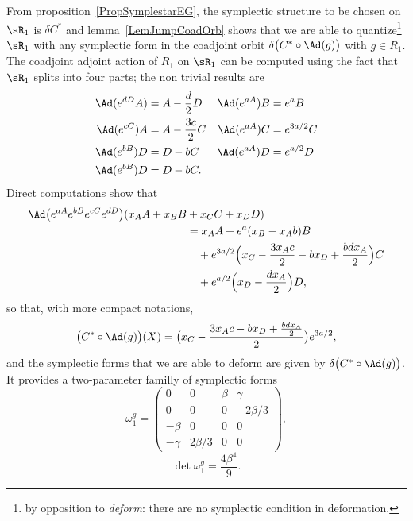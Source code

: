 From proposition~\ref{PropSymplestarEG}, the symplectic structure to be chosen on $\sR_1$ is $\delta C^*$ and lemma~\ref{LemJumpCoadOrb} shows that we are able to quantize\footnote{by opposition to \emph{deform}: there are no symplectic condition in deformation.} $\sR_1$ with any symplectic form in the coadjoint orbit $\delta\big( C^*\circ\Ad(g) \big)$ with $g\in R_1$. The coadjoint adjoint action of $R_1$ on $\sR_1$ can be computed using the fact that $\sR_1$ splits into four parts; the non trivial results are
\begin{align*}
	\Ad( e^{dD}A) & =A-\frac{ d }{2}D  & \Ad( e^{aA})B & = e^{a}B    \\
	\Ad( e^{cC})A & =A-\frac{ 3c }{2}C & \Ad( e^{aA})C & = e^{3a/2}C \\
	\Ad( e^{bB})D & =D-bC              & \Ad( e^{aA})D & = e^{a/2}D  \\
	\Ad( e^{bB})D & =D-bC.
\end{align*}
Direct computations show that
\begin{equation}
	\begin{split}
		\Ad\big(  e^{aA} e^{bB} e^{cC} e^{dD} \big)(x_AA+x_BB&+x_CC+x_DD)\\
		&=x_AA+ e^{a}(x_B-x_Ab)B\\
		&\quad + e^{3a/2}\Big( x_C-\frac{ 3x_Ac }{2}-bx_D +\frac{ bdx_A }{2} \Big)C\\
		&\quad+ e^{a/2}\Big( x_D-\frac{ dx_A }{2} \Big)D,
	\end{split}
\end{equation}
so that, with more compact notations,
\begin{align}
	\big( C^*\circ\Ad(g) \big)(X)=\big( x_C-\frac{ 3x_Ac-bx_D+\frac{ bdx_A }{2} }{2} \big) e^{3a/2},
\end{align}
and the symplectic forms that we are able to deform are given by $\delta\big( C^*\circ\Ad(g) \big)$. It provides a two-parameter familly of symplectic forms
\begin{equation}
	\omega_1^g=
	\begin{pmatrix}
		0       & 0        & \beta & \gamma    \\
		0       & 0        & 0     & -2\beta/3 \\
		-\beta  & 0        & 0     & 0         \\
		-\gamma & 2\beta/3 & 0     & 0
	\end{pmatrix},
\end{equation}
\[
	\det\omega_1^g=\frac{ 4\beta^4 }{ 9 }.
\]



